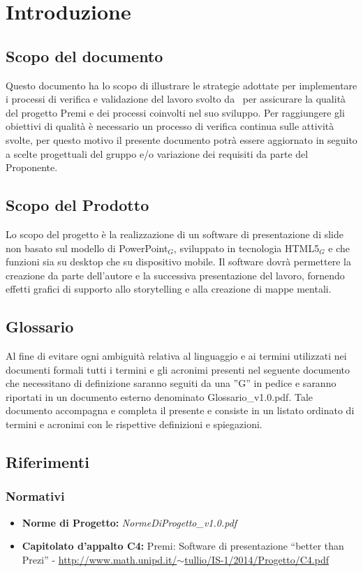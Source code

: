 \section{Introduzione}

\subsection{Scopo del documento}
Questo documento ha lo scopo di illustrare le strategie adottate per implementare i processi di verifica e validazione del lavoro svolto da \gruppo\ per assicurare la qualità del progetto Premi e dei processi coinvolti nel suo sviluppo. Per raggiungere gli obiettivi di qualità è necessario un processo di verifica continua sulle attività svolte, per questo motivo il presente documento potrà essere aggiornato in seguito a scelte progettuali del gruppo e/o variazione dei requisiti da parte del Proponente.

\subsection{Scopo del Prodotto}
Lo scopo del progetto è la realizzazione di un software di presentazione di slide non basato sul modello di PowerPoint$_{G}$, sviluppato in tecnologia HTML5$_{G}$ e che funzioni sia su desktop che su dispositivo mobile. Il software dovrà permettere la creazione da parte dell'autore e la successiva presentazione del lavoro, fornendo effetti grafici di supporto allo storytelling e alla creazione di mappe mentali.

\subsection{Glossario}
Al fine di evitare ogni ambiguità relativa al linguaggio e ai termini utilizzati nei documenti formali tutti i termini e gli acronimi presenti nel seguente documento che necessitano di definizione saranno seguiti da una ”G” in pedice e saranno riportati in un documento esterno denominato Glossario\_v1.0.pdf. Tale documento accompagna e completa il presente e consiste in un listato ordinato di termini e acronimi con le rispettive definizioni e spiegazioni.

\subsection{Riferimenti}
\subsubsection{Normativi}
\begin{itemize}
	\item \textbf{Norme di Progetto:} \textit{NormeDiProgetto\_v1.0.pdf}
	\item \textbf{Capitolato d'appalto C4:} Premi: Software di presentazione ``better than Prezi'' - \href{http://www.math.unipd.it/~tullio/IS-1/2014/Progetto/C4.pdf}{http://www.math.unipd.it/$\sim$tullio/IS-1/2014/Progetto/C4.pdf}
\end{itemize}
